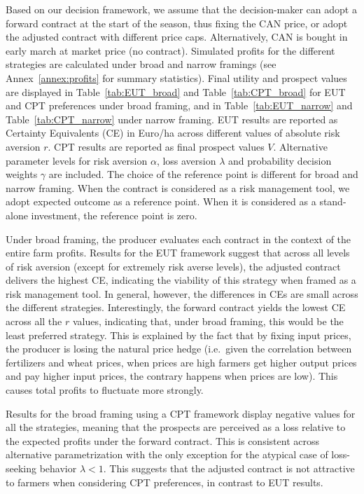 \documentclass[12pt,a4paper]{article}
\begin{document}
Based on our decision framework, we assume that the decision-maker can adopt a forward contract at the start of the season, thus fixing the CAN price, or adopt the adjusted contract with different price caps. Alternatively, CAN is bought in early march at market price (no contract). Simulated profits for the different strategies are calculated under broad and narrow framings (see Annex~\ref{annex:profits} for summary statistics). Final utility and prospect values are displayed in Table~\ref{tab:EUT_broad} and Table~\ref{tab:CPT_broad} for EUT and CPT preferences under broad framing, and in Table~\ref{tab:EUT_narrow} and Table~\ref{tab:CPT_narrow} under narrow framing. EUT results are reported as Certainty Equivalents (CE) in Euro/ha across different values of absolute risk aversion $r$. CPT results are reported as final prospect values $V$. Alternative parameter levels for risk aversion $\alpha$, loss aversion $\lambda$ and probability decision weights $\gamma$ are included. The choice of the reference point is different for broad and narrow framing. When the contract is considered as a risk management tool, we adopt expected outcome as a reference point. When it is considered as a stand-alone investment, the reference point is zero.

Under broad framing, the producer evaluates each contract in the context of the entire farm profits. Results for the EUT framework suggest that across all levels of risk aversion (except for extremely risk averse levels), the adjusted contract delivers the highest CE, indicating the viability of this strategy when framed as a risk management tool. In general, however, the differences in CEs are small across the different strategies. Interestingly, the forward contract yields the lowest CE across all the $r$ values, indicating that, under broad framing, this would be the least preferred strategy. This is explained by the fact that by fixing input prices, the producer is losing the natural price hedge (i.e.\ given the correlation between fertilizers and wheat prices, when prices are high farmers get higher output prices and pay higher input prices, the contrary happens when prices are low). This causes total profits to fluctuate more strongly.

Results for the broad framing using a CPT framework display negative values for all the strategies, meaning that the prospects are perceived as a loss relative to the expected profits under the forward contract. This is consistent across alternative parametrization with the only exception for the atypical case of loss-seeking behavior $\lambda < 1$. This suggests that the adjusted contract is not attractive to farmers when considering CPT preferences, in contrast to EUT results.
\end{document}
